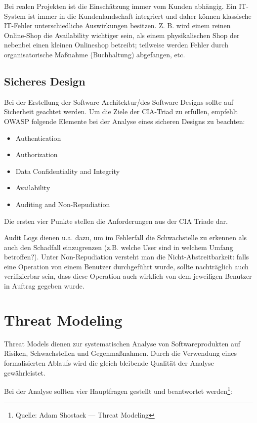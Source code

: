 Bei realen Projekten ist die Einschätzung immer vom Kunden abhängig. Ein IT-System ist immer in die Kundenlandschaft integriert und daher können klassische IT-Fehler unterschiedliche Auswirkungen besitzen. Z. B. wird einem reinen Online-Shop die Availability wichtiger sein, als einem physikalischen Shop der nebenbei einen kleinen Onlineshop betreibt; teilweise werden Fehler durch organisatorische Maßnahme (Buchhaltung) abgefangen, etc.


\subsection{Sicheres Design}

Bei der Erstellung der Software Architektur/des Software Designs sollte auf Sicherheit geachtet werden. Um die Ziele der CIA-Triad zu erfüllen, empfehlt OWASP folgende Elemente bei der Analyse eines sicheren Designs zu beachten:

\begin{itemize}
	\item Authentication
	\item Authorization
	\item Data Confidentiality and Integrity
	\item Availability
	\item Auditing and Non-Repudiation
\end{itemize}

Die ersten vier Punkte stellen die Anforderungen aus der CIA Triade dar.

Audit Logs dienen u.a. dazu, um im Fehlerfall die Schwachstelle zu erkennen als auch den Schadfall einzugrenzen (z.B. welche User sind in welchem Umfang betroffen?). Unter Non-Repudiation versteht man die Nicht-Abstreitbarkeit: falls eine Operation von einem Benutzer durchgeführt wurde, sollte nachträglich auch verifizierbar sein, dass diese Operation auch wirklich von dem jeweiligen Benutzer in Auftrag gegeben wurde.

\section{Threat Modeling}
\label{threat_model}

Threat Models dienen zur systematischen Analyse von Softwareprodukten auf Risiken, Schwachstellen und Gegenmaßnahmen. Durch die Verwendung eines formalisierten Ablaufs wird die gleich bleibende Qualität der Analyse gewährleistet.

Bei der Analyse sollten vier Hauptfragen gestellt und beantwortet werden\footnote{Quelle: Adam Shostack --- Threat Modeling}:

